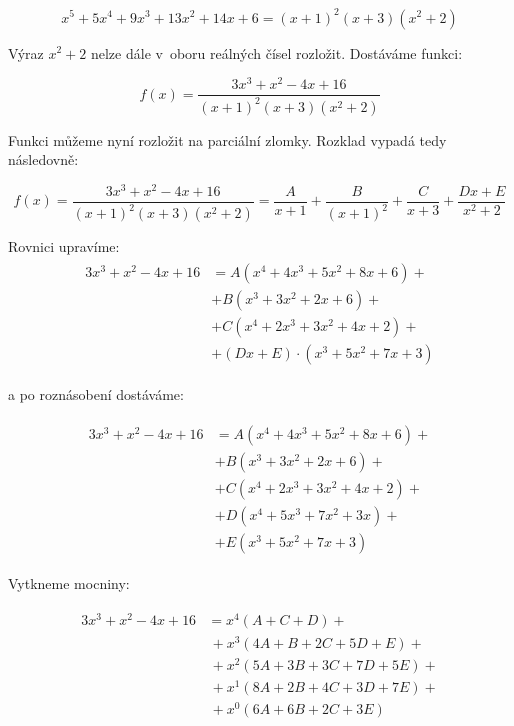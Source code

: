 \begin{displaymath}
	x^5+5x^4+9x^3+13x^2+14x+6 = (x+1)^2(x+3)(x^2+2)
\end{displaymath}

Výraz $x^2+2$ nelze dále v~oboru reálných čísel rozložit. Dostáváme funkci:

\begin{displaymath}
f(x)=\frac{3x^3+x^2-4x+16}{(x+1)^2(x+3)(x^2+2)}
\end{displaymath}

Funkci můžeme nyní rozložit na parciální zlomky. Rozklad vypadá tedy následovně:

\begin{displaymath}
f(x)=\frac{3x^3+x^2-4x+16}{(x+1)^2(x+3)(x^2+2)}
=
\frac{A}{x+1} +
\frac{B}{(x+1)^2} +
\frac{C}{x+3} +
\frac{Dx+E}{x^2+2}
\end{displaymath}

Rovnici upravíme:
\begin{gather*}
\begin{aligned}
3x^3+x^2-4x+16 &= 
 A(x^4+4x^3+5x^2+8x+6) + \\
& + B(x^3+3x^2+2x+6) + \\
& + C(x^4+2x^3+3x^2+4x+2) +\\
& + (Dx+E)\cdot(x^3+5x^2+7x+3)
\end{aligned}
\end{gather*}

a po roznásobení dostáváme:

\begin{gather*}
 \begin{aligned}
3x^3 + x^2 - 4x + 16 &
  = A(x^4 + 4x^3+5x^2+8x+6) + \\
& + B (x^3+3x^2+2x+6) + \\
& + C (x^4+2x^3+3x^2+4x+2) + \\
& + D (x^4+5x^3+7x^2+3x) + \\
& + E (x^3+5x^2+7x+3)
	\end{aligned}
\end{gather*}

Vytkneme mocniny:

\begin{gather*}
\begin{aligned}
3x^3+x^2-4x+16 &
 = x^4(A+C+D) + \\
& \,+ x^3(4A+B+2C+5D+E) + \\
& \,+ x^2(5A+3B+3C+7D+5E) + \\
& \,+ x^1(8A+2B+4C+3D+7E) + \\
& \,+ x^0(6A+6B+2C+3E) 
\end{aligned}
\end{gather*}

